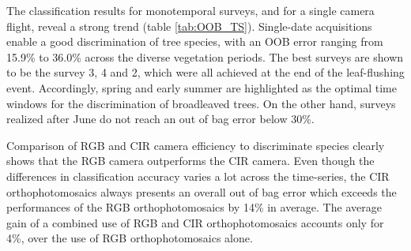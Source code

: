 \documentclass[remotesensing,article,submit,moreauthors,pdftex,12pt,a4paper]{mdpi} %
\begin{document}
The classification results for monotemporal surveys, and for a single camera flight, reveal a strong trend (table \ref{tab:OOB_TS}). 
Single-date acquisitions enable a good discrimination of tree species, with an OOB error ranging from 15.9\% to 36.0\% across the diverse vegetation periods. 
The best surveys are shown to be the survey 3, 4 and 2, which were all achieved at the end of the leaf-flushing event. 
Accordingly, spring and early summer are highlighted as the optimal time windows for the discrimination of broadleaved trees. 
On the other hand, surveys realized after June do not reach an out of bag error below 30\%. 

Comparison of RGB and CIR camera efficiency to discriminate species clearly shows that the RGB camera outperforms the CIR camera. Even though the differences in classification accuracy varies a lot across the time-series, the CIR orthophotomosaics always presents an overall out of bag error which exceeds the performances of the RGB orthophotomosaics by 14\% in average.
The average gain of a combined use of RGB and CIR orthophotomosaics accounts only for 4\%, over the use of RGB orthophotomosaics alone.
\end{document}
